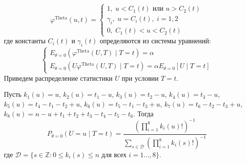     $$
    \varphi^{\text{Theta}}(u,t)=\begin{cases}
        1, \; u<C_1(t) \text{ или } u>C_2(t)\\
        \gamma_i, \; u=C_i(t), \; i=1,2\\
        0, \; C_1(t)<u<C_2(t)
    \end{cases}
    $$
    где константы $C_i(t)$ и $\gamma_i(t)$ определяются из системы уравнений:
    $$
    \begin{cases}
        E_{\theta=0}(\varphi^{\text{Theta}}(U,T) \mid T=t)=\alpha \\
        E_{\theta=0}(U\varphi^{\text{Theta}}(U,T) \mid T=t)=\alpha E_{\theta=0}[U \mid T=t]
    \end{cases}
    $$
    Приведем распределение статистики $U$ при условии $T=t$.      
    \begin{lemma}\label{u_dist}
        Пусть $k_1(u)=u$, $k_2(u)=t_1-u$, $k_3(u)=t_2-u$, $k_4(u)=t_3-u$, $k_5(u)=t_4-t_1-t_2+u$, $k_6(u)=t_5-t_1-t_3+u$,
        $k_7(u)=t_6 - t_2 - t_3 + u$, $k_8(u)=n-u+t_1+t_2+t_3-t_4-t_5-t_6$.
        Тогда
        $$P_{\theta=0}(U=u \mid T=t)=\dfrac{(\prod_{i=1}^8 k_i(u)!)^{-1}}
            {\sum_{s\in \mathcal{D}} (\prod_{i=1}^8 k_i(s)!)^{-1}}$$
        где $\mathcal{D}=\{s \in \mathbb{Z}: 0\leq k_i(s) \leq n \text{ для всех } i=1\ldots,8\}$.
    \end{lemma}

